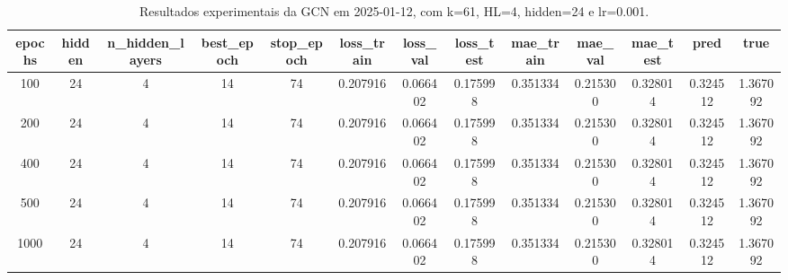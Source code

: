\begin{table}[h]
\centering
\caption{Resultados experimentais da GCN em 2025-01-12, com k=61, HL=4, hidden=24 e lr=0.001.}
\label{tab:gcn_results_k61_hl4_h24_d20250112}
\begin{tabular}{ccccccccccccc}
\toprule
epochs & hidden & n\_hidden\_layers & best\_epoch & stop\_epoch & loss\_train & loss\_val & loss\_test & mae\_train & mae\_val & mae\_test & pred & true \\
\midrule
100 & 24 & 4 & 14 & 74 & 0.207916 & 0.066402 & 0.175998 & 0.351334 & 0.215300 & 0.328014 & 0.324512 & 1.367092 \\
200 & 24 & 4 & 14 & 74 & 0.207916 & 0.066402 & 0.175998 & 0.351334 & 0.215300 & 0.328014 & 0.324512 & 1.367092 \\
400 & 24 & 4 & 14 & 74 & 0.207916 & 0.066402 & 0.175998 & 0.351334 & 0.215300 & 0.328014 & 0.324512 & 1.367092 \\
500 & 24 & 4 & 14 & 74 & 0.207916 & 0.066402 & 0.175998 & 0.351334 & 0.215300 & 0.328014 & 0.324512 & 1.367092 \\
1000 & 24 & 4 & 14 & 74 & 0.207916 & 0.066402 & 0.175998 & 0.351334 & 0.215300 & 0.328014 & 0.324512 & 1.367092 \\
\bottomrule
\end{tabular}
\end{table}
